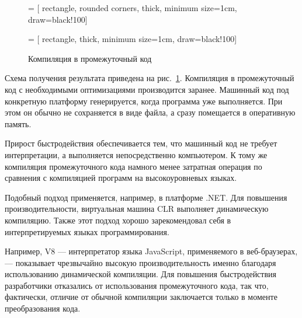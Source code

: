 \begin{figure}
  \begin{centering}
     = [
      rectangle,
      rounded corners,
      thick,
      minimum size=1cm,
      draw=black!100]
    
     = [
      rectangle,
      thick,
      minimum size=1cm,
      draw=black!100]
    
    \par
  \end{centering}

  \caption{Компиляция в промежуточный код\label{fig:jit}}
\end{figure}

Схема получения результата приведена на рис.~\ref{fig:jit}. Компиляция
в промежуточный код с необходимыми оптимизациями производится
заранее. Машинный код под конкретную платформу генерируется, когда
программа уже выполняется. При этом он обычно не сохраняется в виде
файла, а сразу помещается в оперативную память.

Прирост быстродействия обеспечивается тем, что машинный код не требует
интерпретации, а выполняется непосредственно компьютером. К тому же
компиляция промежуточного кода намного менее затратная операция по
сравнения с компиляцией программ на высокоуровневых языках.

Подобный подход применяется, например, в платформе .NET. Для повышения
производительности, виртуальная машина CLR выполняет динамическую
компиляцию. Также этот подход хорошо зарекомендовал себя в
интерпретируемых языках программирования.

Например, V8 — интерпретатор языка JavaScript, применяемого в
веб-браузерах, — показывает чрезвычайно высокую производительность
именно благодаря использованию динамической компиляции. Для повышения
быстродействия разработчики отказались от использования промежуточного
кода, так что, фактически, отличие от обычной компиляции заключается
только в моменте преобразования кода.

